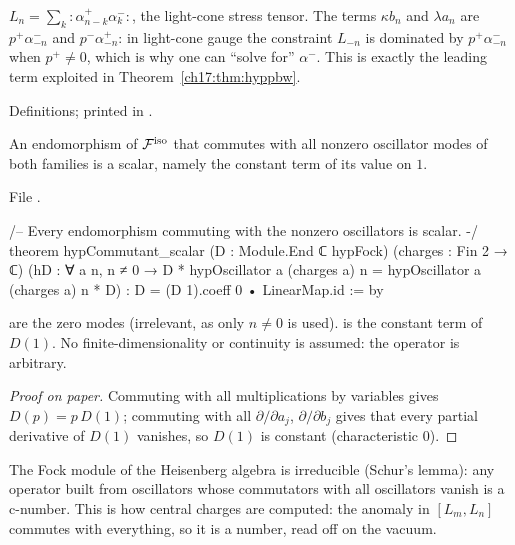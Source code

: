 \begin{physics}
$L_n=\sum_k{:}\alpha^+_{n-k}\alpha^-_k{:}$, the light-cone stress tensor.  The terms $\kappa b_n$ and $\lambda a_n$ are
$p^+\alpha^-_{-n}$ and $p^-\alpha^+_{-n}$: in light-cone gauge the constraint $L_{-n}$ is dominated by
$p^+\alpha^-_{-n}$ when $p^+\neq0$, which is why one can ``solve for'' $\alpha^-$.  This is exactly the leading term
exploited in Theorem~\ref{ch17:thm:hyppbw}.
\end{physics}

\begin{status}
Definitions; printed in .
\end{status}

\begin{theorem}[Commutant]\label{ch17:thm:hypcommutant}
An endomorphism of $\mathcal{F}^{\mathrm{iso}}$ that commutes with all nonzero oscillator modes of both families is a
scalar, namely the constant term of its value on $1$.
\end{theorem}

\noindent File .
\begin{leancode}
/-- Every endomorphism commuting with the nonzero oscillators is scalar. -/
theorem hypCommutant_scalar (D : Module.End ℂ hypFock) (charges : Fin 2 → ℂ)
    (hD : ∀ a n, n ≠ 0 → D * hypOscillator a (charges a) n =
      hypOscillator a (charges a) n * D) :
    D = (D 1).coeff 0 • LinearMap.id := by
\end{leancode}

\begin{dictionary}
 are the zero modes (irrelevant, as only $n\ne0$ is used).   is the constant term of
$D(1)$.  No finite-dimensionality or continuity is assumed: the operator is arbitrary.
\end{dictionary}

\begin{proof}[Proof on paper]
Commuting with all multiplications by variables gives $D(p)=p\,D(1)$; commuting with all $\partial/\partial a_j$,
$\partial/\partial b_j$ gives that every partial derivative of $D(1)$ vanishes, so $D(1)$ is constant (characteristic $0$).
\end{proof}

\begin{physics}
The Fock module of the Heisenberg algebra is irreducible (Schur's lemma): any operator built from oscillators
whose commutators with all oscillators vanish is a c-number.  This is how central charges are computed: the
anomaly in $[L_m,L_n]$ commutes with everything, so it is a number, read off on the vacuum.
\end{physics}

